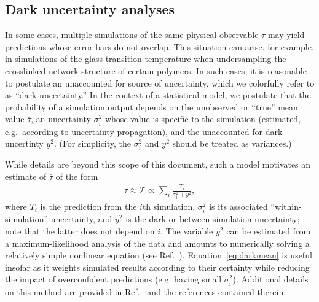 \subsection{Dark uncertainty analyses}

In some cases, multiple simulations of the same physical observable $\tau$ may yield predictions whose error bars do not overlap.  This situation can arise, for example, in simulations of the glass transition temperature when undersampling the crosslinked network structure of certain polymers.  In such cases, it is reasonable to postulate an unaccounted for source of uncertainty, which we colorfully refer to as ``dark uncertainty.''  In the context of a statistical model, we postulate that the probability of a simulation output depends on the unobserved or ``true'' mean value $\bar \tau$, an uncertainty $\sigma_i^2$ whose value is specific to the simulation (estimated, e.g.\ according to uncertainty propagation), and the unaccounted-for dark uncertinty $y^2$.  (For simplicity, the $\sigma_i^2$ and $y^2$ should be treated as variances.)

While details are beyond this scope of this document, such a model motivates an estimate of $\bar \tau$ of the form
\begin{align}
\bar \tau \approx \mathcal T \propto \sum_i \frac{T_i}{\sigma_i^2 + y^2}, \label{eq:darkmean}
\end{align}
where $T_i$ is the prediction from the $i$th simulation, $\sigma_i^2$ is its associated ``within-simulation'' uncertainty, and $y^2$ is the dark or between-simulation uncertainty; note that the latter does not depend on $i$.  The variable $y^2$ can be estimated from a maximum-likelihood analysis of the data and amounts to numerically solving a relatively simple nonlinear equation (see Ref.~\cite{patrone1}).  Equation~\eqref{eq:darkmean} is useful insofar as it weights simulated results according to their certainty while reducing the impact of overconfident predictions (e.g. having small $\sigma_i^2$).  Additional details on this method are provided in Ref.~\cite{patrone1} and the references contained therein.



